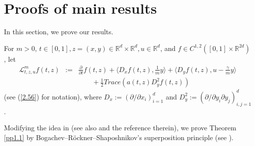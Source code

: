 \documentclass[12pt]{article}
\begin{document}
\section{Proofs of main results}\label{sec:4}

In this section, we prove our results.

For $m>0$, $t\in [0,1], z=(x,y)%
\in  \mathbb{R}^{d}\times \mathbb{R}^{d}, u\in \mathbb{R}^{d}$, and $f\in C^{1,2}([0,1]\times \mathbb{R}^{2d})$,
let 
\begin{eqnarray}
\mathcal{L}^m_{t,z,u}f(t,z)
&:=&\frac{\partial }{\partial t}f(t, z)+\langle D_x f(t, z),\frac{1}{m}y\rangle+\langle D_y f(t, z),u-\frac{\gamma}{m}y\rangle\\
&&\qquad +\frac{1}{2}Trace (a(t,z)D_y^2f(t, z))\nonumber
\end{eqnarray}
(see (\ref{2.56}) for notation), where $D_x:=(\partial/\partial x_i)_{i=1}^d$ and $D_y^2:=(\partial/\partial y_i\partial y_j)_{i,j=1}^d$.

Modifying the idea in \cite{M08,M21} (see also \cite{M2021} and the reference therein), 
we prove Theorem \ref{pp1.1} by Bogachev--R\"ockner--Shaposhnikov's superposition principle (see \cite{Bog21}).
\end{document}
